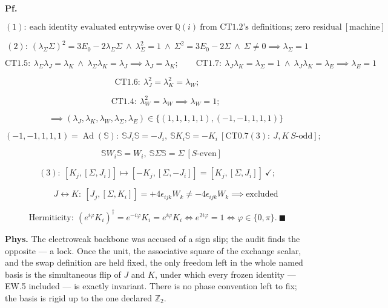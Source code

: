 \begin{theorem}
\textbf{Pf.}

\[
(1):\ \text{each identity evaluated entrywise over}\ \mathbb Q(i)\ \text{from CT1.2's definitions; zero residual}\ [\text{machine}]
\]

\[
(2):\ (\lambda_\Sigma\Sigma)^2=3E_0-2\lambda_\Sigma\Sigma\ \wedge\ \lambda_\Sigma^2=1\ \wedge\ \Sigma^2=3E_0-2\Sigma\ \wedge\ \Sigma\ne0\implies\lambda_\Sigma=1
\]

\[
\mathrm{CT1.5}:\ \lambda_\Sigma\lambda_J=\lambda_K\ \wedge\ \lambda_\Sigma\lambda_K=\lambda_J\implies\lambda_J=\lambda_K;\qquad \mathrm{CT1.7}:\ \lambda_J\lambda_K=\lambda_\Sigma=1\ \wedge\ \lambda_J\lambda_K=\lambda_E\implies\lambda_E=1
\]

\[
\mathrm{CT1.6}:\ \lambda_J^2=\lambda_K^2=\lambda_W;
\]

\[
\qquad \mathrm{CT1.4}:\ \lambda_W^2=\lambda_W\implies\lambda_W=1;
\]

\[
\qquad \implies(\lambda_J,\lambda_K,\lambda_W,\lambda_\Sigma,\lambda_E)\in\{(1,1,1,1,1),(-1,-1,1,1,1)\}
\]

\[
(-1,-1,1,1,1)=\operatorname{Ad}(\mathbb S):\ \mathbb S J_i\mathbb S=-J_i,\ \mathbb S K_i\mathbb S=-K_i\ [\mathrm{CT0.7}(3):\ J,K\ S\text{-odd}];
\]

\[
\quad \mathbb S W_i\mathbb S=W_i,\ \mathbb S\Sigma\mathbb S=\Sigma\ [S\text{-even}]
\]

\[
(3):\ [K_j,[\Sigma,J_i]]\mapsto[-K_j,[\Sigma,-J_i]]=[K_j,[\Sigma,J_i]]\ \checkmark;
\]

\[
\qquad J\leftrightarrow K:\ [J_j,[\Sigma,K_i]]=+4\epsilon_{ijk}W_k\ne-4\epsilon_{ijk}W_k\implies\text{excluded}
\]

\[
\text{Hermiticity}:\ (e^{i\varphi}K_i)^\dagger=e^{-i\varphi}K_i=e^{i\varphi}K_i\iff e^{2i\varphi}=1\iff\varphi\in\{0,\pi\}.\ \blacksquare
\]

\textbf{Phys.} The electroweak backbone was accused of a sign slip; the audit finds the opposite — a lock. Once the unit, the associative square of the exchange scalar, and the swap definition are held fixed, the only freedom left in the whole named basis is the simultaneous flip of $J$ and $K$, under which every frozen identity — EW.5 included — is exactly invariant. There is no phase convention left to fix; the basis is rigid up to the one declared $\mathbb Z_2$.

\end{theorem}

